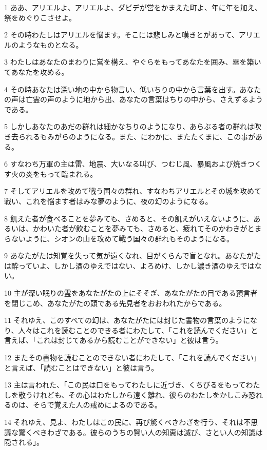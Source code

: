 \par 1 ああ、アリエルよ、アリエルよ、ダビデが営をかまえた町よ、年に年を加え、祭をめぐりこさせよ。
\par 2 その時わたしはアリエルを悩ます。そこには悲しみと嘆きとがあって、アリエルのようなものとなる。
\par 3 わたしはあなたのまわりに営を構え、やぐらをもってあなたを囲み、塁を築いてあなたを攻める。
\par 4 その時あなたは深い地の中から物言い、低いちりの中から言葉を出す。あなたの声は亡霊の声のように地から出、あなたの言葉はちりの中から、さえずるようである。
\par 5 しかしあなたのあだの群れは細かなちりのようになり、あらぶる者の群れは吹き去られるもみがらのようになる。また、にわかに、またたくまに、この事がある。
\par 6 すなわち万軍の主は雷、地震、大いなる叫び、つむじ風、暴風および焼きつくす火の炎をもって臨まれる。
\par 7 そしてアリエルを攻めて戦う国々の群れ、すなわちアリエルとその城を攻めて戦い、これを悩ます者はみな夢のように、夜の幻のようになる。
\par 8 飢えた者が食べることを夢みても、さめると、その飢えがいえないように、あるいは、かわいた者が飲むことを夢みても、さめると、疲れてそのかわきがとまらないように、シオンの山を攻めて戦う国々の群れもそのようになる。
\par 9 あなたがたは知覚を失って気が遠くなれ、目がくらんで盲となれ。あなたがたは酔っていよ、しかし酒のゆえではない、よろめけ、しかし濃き酒のゆえではない。
\par 10 主が深い眠りの霊をあなたがたの上にそそぎ、あなたがたの目である預言者を閉じこめ、あなたがたの頭である先見者をおおわれたからである。
\par 11 それゆえ、このすべての幻は、あなたがたには封じた書物の言葉のようになり、人々はこれを読むことのできる者にわたして、「これを読んでください」と言えば、「これは封じてあるから読むことができない」と彼は言う。
\par 12 またその書物を読むことのできない者にわたして、「これを読んでください」と言えば、「読むことはできない」と彼は言う。
\par 13 主は言われた、「この民は口をもってわたしに近づき、くちびるをもってわたしを敬うけれども、その心はわたしから遠く離れ、彼らのわたしをかしこみ恐れるのは、そらで覚えた人の戒めによるのである。
\par 14 それゆえ、見よ、わたしはこの民に、再び驚くべきわざを行う、それは不思議な驚くべきわざである。彼らのうちの賢い人の知恵は滅び、さとい人の知識は隠される」。
